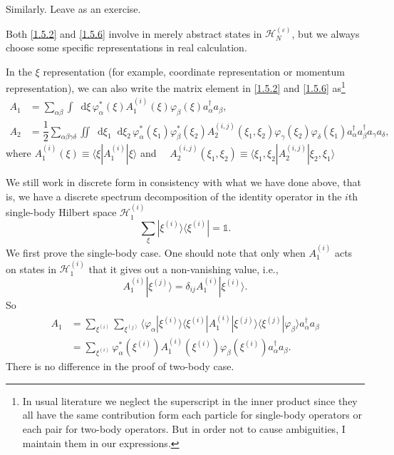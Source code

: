\documentclass[b5paper,10pt,UTF8]{book}
\newcommand*\dd{\mathop{}\!\mathrm{d}}
\numberwithin{equation}{section}
\begin{document}
		\begin{Proof}
			Similarly. Leave as an exercise.
		\end{Proof}
		Both \eqref{1.5.2} and \eqref{1.5.6} involve in merely abstract states in $\mathcal{H}_N^{(\varepsilon)}$, but we always choose some specific representations in real calculation.


		\begin{Corollary}
			In the $\xi$ representation (for example, coordinate representation or momentum representation), we can also write the matrix element in \eqref{1.5.2} and \eqref{1.5.6} as\footnote{In usual literature we neglect the superscript in the inner product since they all have the same contribution form each particle for single-body operators or each pair for two-body operators. But in order not to cause ambiguities, I maintain them in our expressions.}
			\begin{align}
				A_1&=\sum_{\alpha\beta}\int\dd\xi\,\varphi^*_\alpha(\xi)A_1^{(i)}(\xi)\varphi_\beta(\xi)a_\alpha^\dagger a_\beta,\label{1.5.7}\\
				A_2&=\dfrac{1}{2}\sum_{\alpha\beta\gamma\delta}\iint\dd\xi_1\dd\xi_2\,\varphi_\alpha^*(\xi_1)\varphi_\beta^*(\xi_2)A_2^{(i,j)}(\xi_1,\xi_2)\varphi_\gamma(\xi_2)\varphi_\delta(\xi_1)a_\alpha^\dagger a_\beta^\dagger a_\gamma a_\delta,\label{1.5.8}
			\end{align}
			where $A_1^{(i)}(\xi)\equiv\langle\xi|A_1^{(i)}|\xi\rangle$ and $\quad A_2^{(i,j)}(\xi_1,\xi_2)\equiv\langle\xi_1,\xi_2|A_2^{(i,j)}|\xi_2,\xi_1\rangle$
		\end{Corollary}
		\begin{Proof}
			We still work in discrete form in consistency with what we have done above, that is, we have a discrete spectrum decomposition of the identity operator in the $i$th single-body Hilbert space $\mathcal{H}_1^{(i)}$
			$$\displaystyle\sum_\xi|\xi^{(i)}\rangle\langle\xi^{(i)}|=\mathbb{1}.$$
			\indent We first prove the single-body case. One should note that only when $A_1^{(i)}$ acts on states in $\mathcal{H}_1^{(i)}$ that it gives out a non-vanishing value, i.e.,
			\begin{equation}\label{1.5.9}
				A_1^{(i)}|\xi^{(j)}\rangle=\delta_{ij}A_1^{(i)}|\xi^{(i)}\rangle.
			\end{equation}
			So
			\begin{align*}
				A_1&=\sum_{\xi^{(i)}}\sum_{\xi^{(j)}}\langle\varphi_\alpha|\xi^{(i)}\rangle\langle\xi^{(i)}|A_1^{(i)}|\xi^{(j)}\rangle\langle\xi^{(j)}|\varphi_\beta\rangle a_\alpha^\dagger a_\beta\\
				&=\sum_{\xi^{(i)}}\varphi^*_\alpha(\xi^{(i)})A_1^{(i)}(\xi^{(i)})\varphi_\beta(\xi^{(i)})a_\alpha^\dagger a_\beta.
			\end{align*}
			There is no difference in the proof of two-body case.
		\end{Proof}
\end{document}
